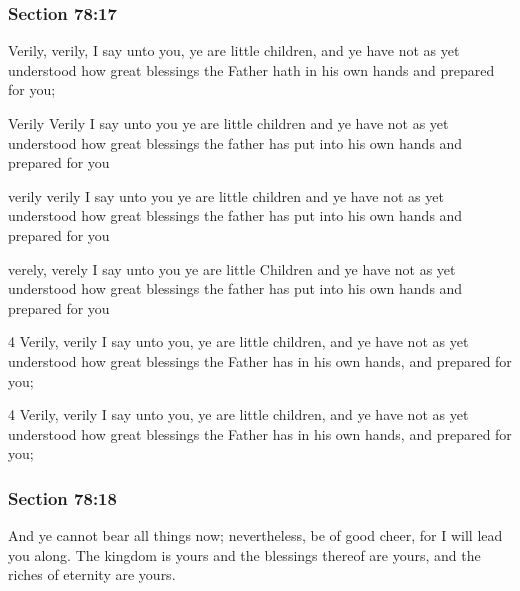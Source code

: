 	\subsubsection{Section 78:17} %
		\label{DC78-17}

		Verily, verily, I say unto you, ye are little children, and ye have not as yet understood how great blessings the Father hath in his own hands and prepared for you;

		\begin{framed}
		\scriptsize
			\begin{compactdesc}
				\item[JSP] Verily Verily I say unto you ye are little children and ye have not as yet understood how great blessings the father has put into his own hands and prepared for you
				\item[RB1] verily verily I say unto you ye are little children and ye have not as yet understood how great blessings the father has put into his own hands and prepared for you
				\item[RB2] verely, verely I say unto you ye are little Children and ye have not as yet understood how great blessings the father has put into his own hands and prepared for you
				\item[DC 1835] 4 Verily, verily I say unto you, ye are little children, and ye have not as yet understood how great blessings the Father has in his own hands, and prepared for you;
				\item[DC 1844] 4 Verily, verily I say unto you, ye are little children, and ye have not as yet understood how great blessings the Father has in his own hands, and prepared for you;
			\end{compactdesc}
		\end{framed}

	\subsubsection{Section 78:18} %
		\label{DC78-18}

		And ye cannot bear all things now; nevertheless, be of good cheer, for I will lead you along.  The kingdom is yours and the blessings thereof are yours, and the riches of eternity are yours.

